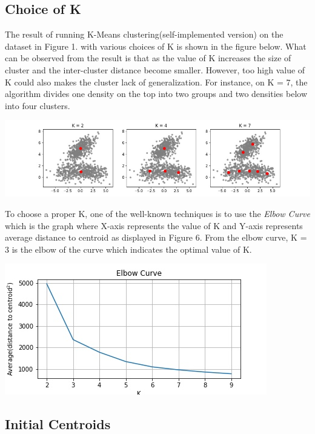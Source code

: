 \documentclass{article}
\begin{document}
\subsection{Choice of K}
The result of running K-Means clustering(self-implemented version) on the dataset in Figure 1. with various choices of K is shown in the figure below. What can be observed from the result is that as the value of K increases the size of cluster and the inter-cluster distance become smaller. However, too high value of K could also makes the cluster lack of generalization. For instance, on K = 7, the algorithm divides one density on the top into two groups and two densities below into four clusters.
\begin{center}
\includegraphics[scale=0.4]{multiple_k}
\end{center}

To choose a proper K, one of the well-known techniques is to use the \textit{Elbow Curve} which is the graph where X-axis represents the value of K and Y-axis represents average distance to centroid as displayed in Figure 6. From the elbow curve, K = 3 is the elbow of the curve which indicates the optimal value of K.\\
\begin{center}
\includegraphics[scale=0.3]{elbow}
\end{center}

\subsection{Initial Centroids}
\end{document}
